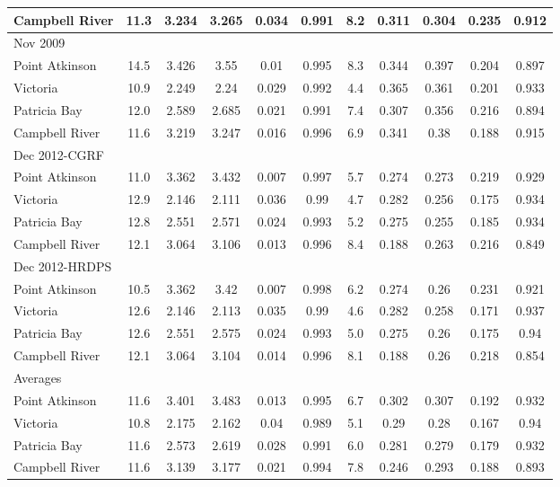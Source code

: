 \documentclass[letterpaper]{tATO2e}
\begin{document}
\begin{table}[h]
{\begin{tabular}{|l |c c c c c | c c c c c|}
Campbell River & 11.3& 3.234& 3.265& 0.034& 0.991& 8.2& 0.311& 0.304& 0.235& 0.912\\
\hline
Nov 2009& & & & & & & & & & \\
Point Atkinson & 14.5& 3.426& 3.55& 0.01& 0.995& 8.3& 0.344& 0.397& 0.204& 0.897\\
Victoria       & 10.9& 2.249& 2.24& 0.029& 0.992& 4.4& 0.365& 0.361& 0.201& 0.933\\
Patricia Bay   & 12.0& 2.589& 2.685& 0.021& 0.991& 7.4& 0.307& 0.356& 0.216& 0.894\\
Campbell River & 11.6& 3.219& 3.247& 0.016& 0.996& 6.9& 0.341& 0.38& 0.188& 0.915\\
\hline
Dec 2012-CGRF& & & & & & & & & & \\
Point Atkinson & 11.0& 3.362& 3.432& 0.007& 0.997& 5.7& 0.274& 0.273& 0.219& 0.929\\
Victoria       & 12.9& 2.146& 2.111& 0.036& 0.99& 4.7& 0.282& 0.256& 0.175& 0.934\\
Patricia Bay   & 12.8& 2.551& 2.571& 0.024& 0.993& 5.2& 0.275& 0.255& 0.185& 0.934\\
Campbell River & 12.1& 3.064& 3.106& 0.013& 0.996& 8.4& 0.188& 0.263& 0.216& 0.849\\
\hline
Dec 2012-HRDPS& & &  &  &  &  &  &  &  &  \\
Point Atkinson &  10.5&  3.362&  3.42&  0.007&  0.998&  6.2&  0.274&  0.26&  0.231&  0.921\\
Victoria       &  12.6&  2.146&  2.113&  0.035&  0.99&  4.6&  0.282&  0.258&  0.171&  0.937\\
Patricia Bay   &  12.6& 2.551& 2.575& 0.024& 0.993& 5.0& 0.275& 0.26& 0.175& 0.94\\
Campbell River & 12.1& 3.064& 3.104& 0.014& 0.996& 8.1& 0.188& 0.26& 0.218& 0.854\\
\hline
\hline
Averages& & & & & & & & & & \\
Point Atkinson & 11.6&	3.401&	3.483&	0.013&	0.995&	6.7&	0.302&	0.307	&0.192	&0.932\\
Victoria       &10.8&	2.175	&2.162	&0.04	&0.989	&5.1	&0.29	&0.28&	0.167&	0.94\\
Patricia Bay   &11.6&	2.573&	2.619&	0.028&	0.991&	6.0&	0.281&	0.279&	0.179&	0.932\\
Campbell River & 11.6&	3.139&	3.177&	0.021&	0.994&	7.8&	0.246&	0.293&	0.188&	0.893\\
\hline
\end{tabular}}
\label{tab:statistics}
\end{table} 
\end{document}
